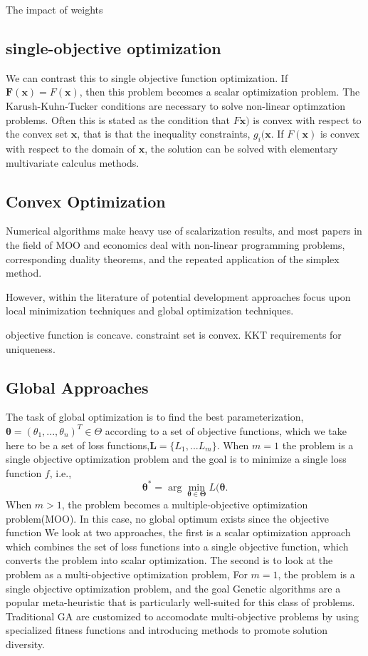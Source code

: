The impact of weights

\subsection{single-objective optimization}



We can contrast this to single objective function optimization.
If $\bm{F}(\bm{x}) = F(\bm{x})$, then this problem becomes a scalar optimization problem.
The Karush-Kuhn-Tucker conditions \cite{karush1939_kkt,kuhn1951_kkt} are necessary to solve non-linear optimzation problems.
Often this is stated as the condition that $F\bm{x})$ is convex with respect to the convex set $\bm{x}$, that is that the inequality constraints, $g_i(\bm{x}$.
If $F(\bm{x})$ is convex with respect to the domain of $\bm{x}$, the solution can be solved with elementary multivariate calculus methods.
\subsection{Convex Optimization}
Numerical algorithms make heavy use of scalarization results, and most papers in the field of MOO and economics deal with non-linear programming problems, corresponding duality theorems, and the repeated application of the simplex method.

However, within the literature of potential development approaches focus upon local minimization techniques and global optimization techniques.

objective function is concave.  constraint set is convex.  KKT requirements for uniqueness.

\subsection{Global Approaches}

The task of global optimization is to find the best parameterization, $\bm{\theta}=(\theta_1,...,\theta_n)^T \in \Theta$ according to a set of objective functions, which we take here to be a set of loss functions,$\bm{L}=\{L_1,...L_m\}$.  When $m=1$ the problem is a single objective optimization problem and the goal is to minimize a single loss function $f$, i.e.,
\begin{equation}
	\bm{\theta}^* = \arg \min_{\bm{\theta}\in\bm{\Theta}} L(\bm{\theta}.
\end{equation}
When $m>1$, the problem becomes a multiple-objective optimization problem(MOO).  In this case, no global optimum exists since the objective function
We look at two approaches, the first is a scalar optimization approach which combines the set of loss functions into a single objective function, which converts the problem into scalar optimization.  The second is to look at the problem as a multi-objective optimization problem,
For $m=1$, the problem is a single objective optimization problem, and the goal
Genetic algorithms are a popular meta-heuristic that is particularly well-suited for this class of problems.  Traditional GA are customized to accomodate multi-objective problems by using specialized fitness functions and introducing methods to promote solution diversity.

